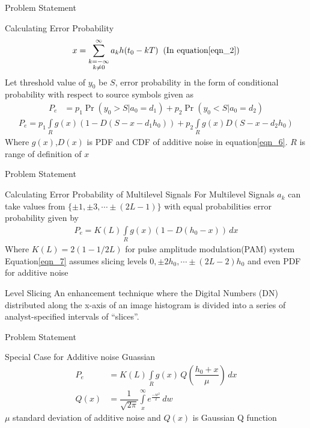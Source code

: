 \documentclass{beamer}
\providecommand{\pr}[1]{\ensuremath{\Pr\left(#1\right)}}
\providecommand{\pr}[1]{\ensuremath{\Pr\left(#1\right)}}
\providecommand{\qfunc}[1]{\ensuremath{Q\left(#1\right)}}
\providecommand{\brak}[1]{\ensuremath{\left(#1\right)}}
\newcommand{\Int}{\int\limits}
\newcommand{\Sum}{\sum\limits}
\begin{document}
\begin{frame}{Problem Statement}
\begin{block}{Calculating Error Probability}
\begin{equation}
x = \Sum_{\substack{k=-\infty \\ k\neq 0}}^{\infty}{a_{k}h(t_{0}-kT)}\;\;\text{(In equation\eqref{eqn_2})}
\end{equation}
Let threshold value of $y_{0}$ be $S$, error probability in the form of conditional probability with respect to
source symbols given as
\begin{align}
P_{e} &= p_{1}\pr{y_{0}>S | a_{0}=d_{1}} + p_{2}\pr{y_{0}<S | a_{0}=d_{2}} 
\end{align}
\begin{multline}
P_{e} = p_{1}\Int_{R}g(x)\brak{1-D(S-x-d_{1}h_{0})} + p_{2}\Int_{R}g(x)D(S-x-d_{2}h_{0}) \label{eqn_6}
\end{multline}
Where $g(x)$,$D(x)$ is PDF and CDF of additive noise in equation\eqref{eqn_6}. $R$ is range of 
definition of $x$
\end{block}
\end{frame}
\begin{frame}{Problem Statement}
\begin{block}{Calculating Error Probability of Multilevel Signals}
For Multilevel Signals $a_{k}$ can take values from $\{\pm 1,\pm 3,\cdots \pm (2L-1)\}$ with equal probabilities
error probability given by 
\begin{align}
P_{e} = K(L)\Int_{R} g(x)\brak{1-D(h_{0}-x)}\,dx \label{eqn_7}
\end{align}
Where $K(L)=2(1-1/2L)$ for pulse amplitude modulation(PAM) system
Equation\eqref{eqn_7} assumes slicing levels $0,\pm 2h_{0},\cdots \pm (2L-2)h_{0}$ and even PDF for additive noise 
\end{block}
\begin{block}{Level Slicing}
An enhancement technique where the Digital Numbers (DN) distributed along the x-axis of an image histogram is divided into a series
of analyst-specified intervals of “slices”.
\end{block}
\end{frame}
\begin{frame}{Problem Statement}
\begin{block}{Special Case for Additive noise Guassian}
\begin{align}
P_{e} &= K(L)\Int_{R} g(x)\,Q\brak{\dfrac{h_{0}+x}{\mu}}\,dx \label{eqn_8} \\
\qfunc{x}  &= \dfrac{1}{\sqrt{2\pi}}\Int_{x}^{\infty}e^{\frac{-w^{2}}{2}}\,dw
\end{align} 
$\mu$ standard deviation of additive noise and $\qfunc{x}$ is Gaussian Q function
\end{block}
\end{frame}
\end{document}
